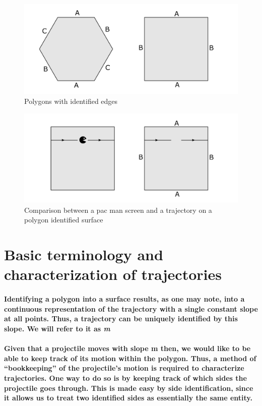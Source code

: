 \documentclass{report}
\begin{document}
\begin{center}
\begin{figure} 
\includegraphics[scale=0.3]{2}
\caption{Polygons with identified edges}
\end{figure}
\end{center}


\begin{center}
\begin{figure} 
\includegraphics[scale=0.3]{3}
\caption{Comparison between a pac man screen and a trajectory on a polygon identified surface}
\end{figure}
\end{center}

\section{Basic terminology and characterization of trajectories}
\paragraph{Identifying a polygon into a surface results, as one may note, into a continuous representation of the trajectory with a single constant slope at all points. Thus, a trajectory can be uniquely identified by this slope. We will refer to it as \textit{m}}

\paragraph{Given that a projectile moves with slope m then, we would like to be able to keep track of its motion within the polygon. Thus, a method of “bookkeeping” of the projectile’s motion is required to characterize trajectories. One way to do so is by keeping track of which sides the projectile goes through. This is made easy by side identification, since it allows us to treat two identified sides as essentially the same entity.}
\end{document}
